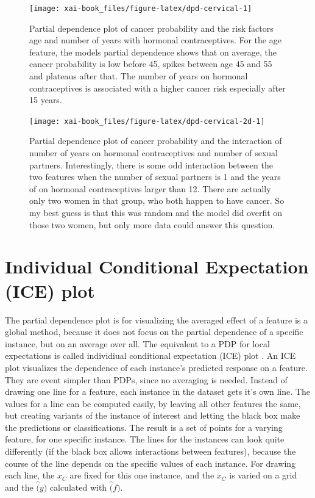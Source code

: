 \documentclass[12pt,]{krantz}
\theoremstyle{definition}
\theoremstyle{definition}
\theoremstyle{definition}
\theoremstyle{remark}
\begin{document}
\begin{figure}

{\centering \texttt{[image: xai-book\_files/figure-latex/dpd-cervical-1]} 

}

\caption{Partial dependence plot of cancer probability and the risk factors age and number of years with hormonal contraceptives. For the age feature, the models partial dependence shows that on average, the cancer probability is low before 45, spikes between age 45 and 55 and plateaus after that. The number of years on hormonal contraceptives is associated with a higher cancer risk especially after 15 years.}\label{fig:dpd-cervical}
\end{figure}

\begin{figure}

{\centering \texttt{[image: xai-book\_files/figure-latex/dpd-cervical-2d-1]} 

}

\caption{Partial dependence plot of cancer probability and the interaction of number of years on hormonal contraceptives and number of sexual partners. Interestingly, there is some odd interaction between the two features when the number of sexual partners is 1 and the years of on hormonal contraceptives larger than 12. There are actually only two women in that group, who both happen to have cancer. So my best guess is that this was random and the model did overfit on those two women, but only more data could answer this question.}\label{fig:dpd-cervical-2d}
\end{figure}

\section{Individual Conditional Expectation (ICE)
plot}\label{individual-conditional-expectation-ice-plot}

The partial dependence plot is for visualizing the averaged effect of a
feature is a global method, because it does not focus on the partial
dependence of a specific instance, but on an average over all. The
equivalent to a PDP for local expectations is called individiual
conditional expectation (ICE) plot \citep{goldstein2015peeking}. An ICE
plot visualizes the dependence of each instance's predicted response on
a feature. They are event simpler than PDPs, since no averaging is
needed. Instead of drawing one line for a feature, each instance in the
dataset gets it's own line. The values for a line can be computed
easily, by leaving all other features the same, but creating variants of
the instance of interest and letting the black box make the predictions
or classifications. The result is a set of points for a varying feature,
for one specific instance. The lines for the instances can look quite
differently (if the black box allows interactions between features),
because the course of the line depends on the specific values of each
instance. For drawing each line, the \(x_C\) are fixed for this one
instance, and the \(x_C\) is varied on a grid and the \(\hat(y)\)
calculated with \(\hat(f)\).
\end{document}

